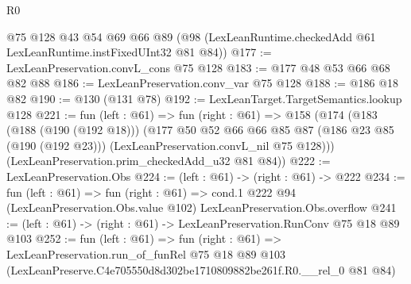 \begin{lexlean}{R0}
\begin{coremodule}
    @75
    @128
    @43
    @54
    @69
    @66
    @89
    (@98 (LexLeanRuntime.checkedAdd @61 LexLeanRuntime.instFixedUInt32 @81 @84))
@177 := LexLeanPreservation.convL_cons @75 @128
@183 := @177 @48 @53 @66 @68 @82 @88
@186 := LexLeanPreservation.conv_var @75 @128
@188 := @186 @18 @82
@190 := @130 (@131 @78)
@192 := LexLeanTarget.TargetSemantics.lookup @128
@221 := fun (left : @61) =>
  fun (right : @61) =>
  @158
    (@174
      (@183
        (@188 (@190 (@192 @18)))
        (@177
          @50
          @52
          @66
          @66
          @85
          @87
          (@186 @23 @85 (@190 (@192 @23)))
          (LexLeanPreservation.convL_nil @75 @128)))
      (LexLeanPreservation.prim_checkedAdd_u32 @81 @84))
@222 := LexLeanPreservation.Obs
@224 := (left : @61) -> (right : @61) -> @222
@234 := fun (left : @61) =>
  fun (right : @61) =>
  cond.{1} @222 @94 (LexLeanPreservation.Obs.value @102) LexLeanPreservation.Obs.overflow
@241 := (left : @61) -> (right : @61) -> LexLeanPreservation.RunConv @75 @18 @89 @103
@252 := fun (left : @61) =>
  fun (right : @61) =>
  LexLeanPreservation.run_of_funRel
    @75
    @18
    @89
    @103
    (LexLeanPreserve.C4e705550d8d302be1710809882be261f.R0.__rel_0 @81 @84)
\end{coremodule}
\end{lexlean}
